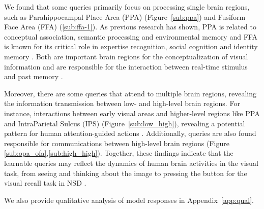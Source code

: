 We found that some queries primarily focus on processing single brain regions, such as Parahippocampal Place Area (PPA) (Figure~\ref{sub:ppa}) and Fusiform Face Area (FFA) (\ref{sub:ffa-1}). As previous research has shown, PPA is related to conceptual association, semantic processing and environmental memory \cite{epstein1999parahippocampal,kohler2002differential,bar2008scenes,epstein2010reliable} and FFA is known for its critical role in expertise recognition, social cognition and identity memory \cite{schultz2003role,tsantani2021ffa,xu2005revisiting}. Both are important brain regions for the conceptualization of visual information and are responsible for the interaction between real-time stimulus and past memory \cite{brewer1998making,ranganath2004category,golarai2007differential}. 

Moreover, there are some queries that attend to multiple brain regions, revealing the information transmission between low- and high-level brain regions. For instance, interactions between early visual areas and higher-level regions like PPA and IntraParietal Sulcus (IPS) (Figure~\ref{sub:low_high}), revealing a potential pattern for human attention-guided actions \cite{tunik2007beyond,connolly2016coding}. Additionally, queries are also found responsible for communications between high-level brain regions (Figure \ref{sub:opa_ofa},\ref{sub:high_high}). Together, these findings indicate that the learnable queries may reflect the dynamics of human brain activities in the visual task, from seeing and thinking about the image to pressing the button for the visual recall task in NSD \cite{allen2022massive}. 



We also provide qualitative analysis of model responses in Appendix~\ref{app:qual}.

